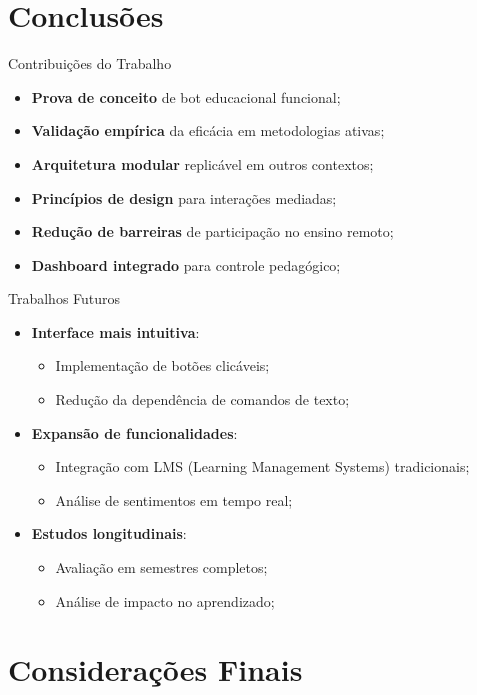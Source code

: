 \documentclass[aspectratio=169]{beamer}
\begin{document}
{\section{Conclusões}

\begin{frame}{Contribuições do Trabalho}
  \begin{itemize}
  \item \textbf{Prova de conceito} de bot educacional funcional;
  \item \textbf{Validação empírica} da eficácia em metodologias ativas;
  \item \textbf{Arquitetura modular} replicável em outros contextos;
  \item \textbf{Princípios de design} para interações mediadas;
  \item \textbf{Redução de barreiras} de participação no ensino remoto;
  \item \textbf{Dashboard integrado} para controle pedagógico;
  \end{itemize}
\end{frame}

\begin{frame}{Trabalhos Futuros}
  \begin{itemize}
  \item \textbf{Interface mais intuitiva}:
    \begin{itemize}
    \item Implementação de botões clicáveis;
    \item Redução da dependência de comandos de texto;
    \end{itemize}
  \item \textbf{Expansão de funcionalidades}:
    \begin{itemize}
    \item Integração com LMS (Learning Management Systems) tradicionais;
    \item Análise de sentimentos em tempo real;
    \end{itemize}
  \item \textbf{Estudos longitudinais}:
    \begin{itemize}
    \item Avaliação em semestres completos;
    \item Análise de impacto no aprendizado;
    \end{itemize}
  \end{itemize}
\end{frame}

\section*{Considerações Finais}

}
\end{document}
